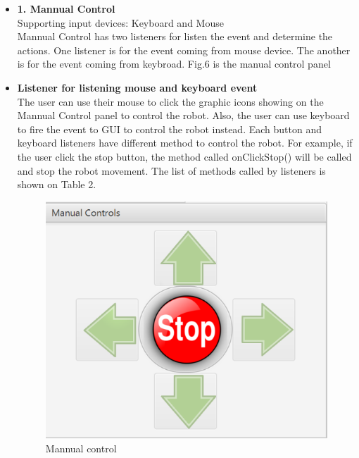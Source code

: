 \begin{itemize}
	\item \textbf{1. Mannual Control}\\
	Supporting input devices: Keyboard and Mouse\\
	Mannual Control has two listeners for listen the event and determine the actions. One listener is for the event coming from mouse device. The another is for the event coming from keybroad. Fig.6 is the manual control panel
	\item  \textbf{Listener for listening mouse and keyboard event}\\
	The user can use their mouse to click the graphic icons showing on the Mannual Control panel to control the robot. Also, the user can use keyboard to fire the event to GUI to control the robot instead. Each button and keyboard listeners have different method to control the robot. For example, if the user click the stop button, the method called onClickStop() will be called and stop the robot movement. The list of methods called by listeners is shown on Table 2.
		
\begin{figure}[H]
	\includegraphics[width=\linewidth]{Control.PNG}  %
	\caption{Mannual control}
	\label{fig:Mannual controller}				
\end{figure}


\end{itemize}

